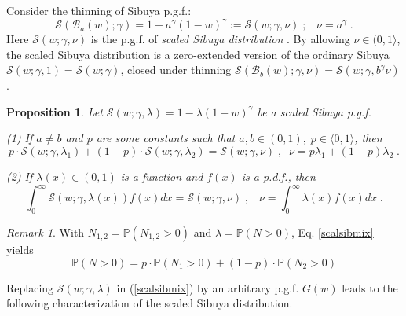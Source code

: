 \documentclass[a4paper,12pt]{amsart}
\newtheorem{Proposition}{Proposition}[section]
\theoremstyle{definition}
\theoremstyle{remark}
\newtheorem{Remark}{Remark}[section]
\begin{document}
Consider the thinning of Sibuya p.g.f.:
\begin{equation}\label{Scaled_sib}
\mathcal{S}(\mathcal{B}_a(w);\gamma)=1-a^{\gamma}(1- w)^{\gamma}:=\mathcal{S}(w;\gamma,\nu)\;;\;\;\; \nu=a^{\gamma} \;.  
\end{equation}
Here $\mathcal{S}(w;\gamma,\nu)$ is the p.g.f. of {\it scaled Sibuya distribution} \cite{Christoph2000, Klebanov2023-xj}. By allowing $\nu \in(0,1 \rangle$, the scaled Sibuya distribution is a zero-extended version of the ordinary Sibuya $\mathcal{S}(w;\gamma,1)=\mathcal{S}(w;\gamma)$, closed under thinning $\mathcal{S}(\mathcal{B}_b(w);\gamma,\nu) = \mathcal{S}(w;\gamma,b^{\gamma}\nu)$. 
 
\begin{Proposition}\label{Sib}
 Let $\mathcal{S}(w;\gamma,\lambda)=1-\lambda(1-w)^{\gamma}$ be a scaled Sibuya p.g.f.
 
 (1) If  $a \neq b$ and $p$ are some constants such that
 $a,b \in (0,1),\; p\in\langle 0,1\rangle$, then 
 \begin{equation}\label{scalsibmix}
 p\cdot \mathcal{S}(w;\gamma,\lambda_1)+(1-p)\cdot \mathcal{S}(w;\gamma,\lambda_2)=\mathcal{S}(w;\gamma, \nu) \;,\;\; \nu=p\lambda_1+(1-p)\lambda_2\;.
 \end{equation}
 
(2) If $\lambda(x)\in (0,1)$ is a function and $f(x)$ is a p.d.f., then
\begin{equation}
 \int_{0}^{\infty}\mathcal{S}(w;\gamma,\lambda(x)) f(x)dx = \mathcal{S}(w;\gamma,\nu)\;,\;\;\;
\nu= \int_{0}^{\infty}\lambda(x) f(x)dx\;.   
\end{equation}
\end{Proposition}
\begin{Remark}
With $N_{1,2}=\mathbb{P}(N_{1,2}>0)$  and $\lambda = \mathbb{P}(N>0)$, Eq. \ref{scalsibmix} yields
\[
\mathbb{P}(N>0)=p\cdot \mathbb{P}(N_{1}>0)+(1-p)\cdot \mathbb{P}(N_{2}>0)
\]
\end{Remark}

Replacing $\mathcal{S}(w;\gamma,\lambda)$ in (\ref{scalsibmix}) by an arbitrary p.g.f. $G(w)$ leads to the following characterization of the scaled Sibuya distribution.
\end{document}
